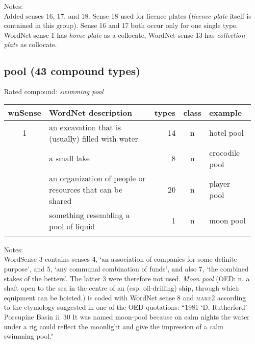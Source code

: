 \noindent
Notes:\\
Added senses 16, 17, and 18. Sense 18 used for licence plates (\emph{licence plate} itself is contained in this group). Sense 16 and 17 both occur only for one single type.
WordNet sense 1 has \emph{home plate} as a collocate, WordNet sense 13 has \emph{collection plate} as collocate.

\pagebreak[4]
\subsection{pool      (43 compound types)}
Rated compound: \emph{swimming pool}
\vspace*{-.2cm}

\noindent
\begin{longtable}{c>{\raggedright\arraybackslash}p{5cm}rc>{\raggedright\arraybackslash}p{2cm}}\lsptoprule
{\small wnSense}&WordNet description&types&class&example\\\midrule
1&an excavation that is (usually) filled with water&14&n&hotel pool\\\tablevspace
2&a small lake&8&n& crocodile pool\\\tablevspace
3&an organization of people or resources that can be shared&20&n&player pool\\\tablevspace
8&something resembling a pool of liquid&1&n&moon pool\\\lspbottomrule
\end{longtable}
\vspace*{-.2cm}

\noindent
Notes:\\
WordSense 3 contains senses 4, `an association of companies for some definite purpose', and 5, `any communal combination of funds', and also 7, `the combined stakes of the betters'. The latter 3 were therefore not used.
\emph{Moon pool} (OED: n. a shaft open to the sea in the centre of an (esp. oil-drilling) ship, through which equipment can be hoisted.) is coded with WordNet sense 8 and \textsc{make2} according to the etymology suggested in one of the OED quotations:  ``1981   ‘D. Rutherford’ Porcupine Basin ii. 30   It was named moon-pool because on calm nights the water under a rig could reflect the moonlight and give the impression of a calm swimming pool.'' 

